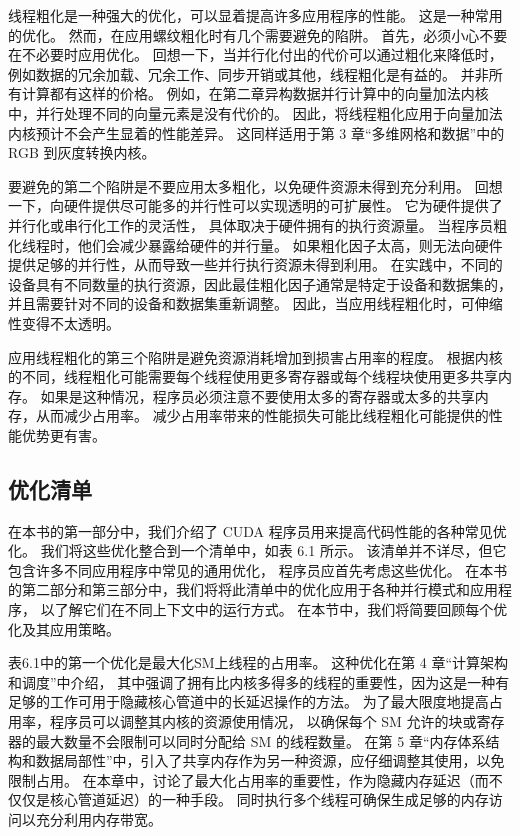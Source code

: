 线程粗化是一种强大的优化，可以显着提高许多应用程序的性能。 这是一种常用的优化。 
然而，在应用螺纹粗化时有几个需要避免的陷阱。 首先，必须小心不要在不必要时应用优化。 
回想一下，当并行化付出的代价可以通过粗化来降低时，例如数据的冗余加载、冗余工作、同步开销或其他，线程粗化是有益的。 
并非所有计算都有这样的价格。 例如，在第二章异构数据并行计算中的向量加法内核中，并行处理不同的向量元素是没有代价的。 
因此，将线程粗化应用于向量加法内核预计不会产生显着的性能差异。 
这同样适用于第 3 章“多维网格和数据”中的 RGB 到灰度转换内核。

要避免的第二个陷阱是不要应用太多粗化，以免硬件资源未得到充分利用。 
回想一下，向硬件提供尽可能多的并行性可以实现透明的可扩展性。 它为硬件提供了并行化或串行化工作的灵活性，
具体取决于硬件拥有的执行资源量。 当程序员粗化线程时，他们会减少暴露给硬件的并行量。 
如果粗化因子太高，则无法向硬件提供足够的并行性，从而导致一些并行执行资源未得到利用。 
在实践中，不同的设备具有不同数量的执行资源，因此最佳粗化因子通常是特定于设备和数据集的，
并且需要针对不同的设备和数据集重新调整。 因此，当应用线程粗化时，可伸缩性变得不太透明。

应用线程粗化的第三个陷阱是避免资源消耗增加到损害占用率的程度。 
根据内核的不同，线程粗化可能需要每个线程使用更多寄存器或每个线程块使用更多共享内存。 
如果是这种情况，程序员必须注意不要使用太多的寄存器或太多的共享内存，从而减少占用率。 
减少占用率带来的性能损失可能比线程粗化可能提供的性能优势更有害。

\subsection{优化清单}
在本书的第一部分中，我们介绍了 CUDA 程序员用来提高代码性能的各种常见优化。 
我们将这些优化整合到一个清单中，如表 6.1 所示。 该清单并不详尽，但它包含许多不同应用程序中常见的通用优化，
程序员应首先考虑这些优化。 在本书的第二部分和第三部分中，我们将将此清单中的优化应用于各种并行模式和应用程序，
以了解它们在不同上下文中的运行方式。 在本节中，我们将简要回顾每个优化及其应用策略。

表6.1中的第一个优化是最大化SM上线程的占用率。 这种优化在第 4 章“计算架构和调度”中介绍，
其中强调了拥有比内核多得多的线程的重要性，因为这是一种有足够的工作可用于隐藏核心管道中的长延迟操作的方法。 
为了最大限度地提高占用率，程序员可以调整其内核的资源使用情况，
以确保每个 SM 允许的块或寄存器的最大数量不会限制可以同时分配给 SM 的线程数量。 
在第 5 章“内存体系结构和数据局部性”中，引入了共享内存作为另一种资源，应仔细调整其使用，以免限制占用。 
在本章中，讨论了最大化占用率的重要性，作为隐藏内存延迟（而不仅仅是核心管道延迟）的一种手段。 
同时执行多个线程可确保生成足够的内存访问以充分利用内存带宽。

